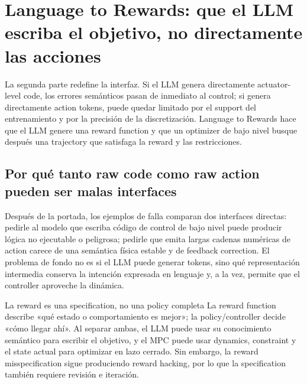 \section{Language to Rewards: que el LLM escriba el objetivo, no directamente las acciones}

La segunda parte redefine la interfaz. Si el LLM genera directamente actuator-level code, los errores semánticos pasan de inmediato al control; si genera directamente action tokens, puede quedar limitado por el support del entrenamiento y por la precisión de la discretización. Language to Rewards hace que el LLM genere una reward function y que un optimizer de bajo nivel busque después una trajectory que satisfaga la reward y las restricciones.

\subsection{Por qué tanto raw code como raw action pueden ser malas interfaces}

Después de la portada, los ejemplos de falla comparan dos interfaces directas: pedirle al modelo que escriba código de control de bajo nivel puede producir lógica no ejecutable o peligrosa; pedirle que emita largas cadenas numéricas de action carece de una semántica física estable y de feedback correction. El problema de fondo no es si el LLM puede generar tokens, sino qué representación intermedia conserva la intención expresada en lenguaje y, a la vez, permite que el controller aproveche la dinámica.




\begin{importantbox}{La reward es una specification, no una policy completa}
La reward function describe «qué estado o comportamiento es mejor»; la policy/controller decide «cómo llegar ahí». Al separar ambas, el LLM puede usar su conocimiento semántico para escribir el objetivo, y el MPC puede usar dynamics, constraint y el state actual para optimizar en lazo cerrado. Sin embargo, la reward misspecification sigue produciendo reward hacking, por lo que la specification también requiere revisión e iteración.
\end{importantbox}

